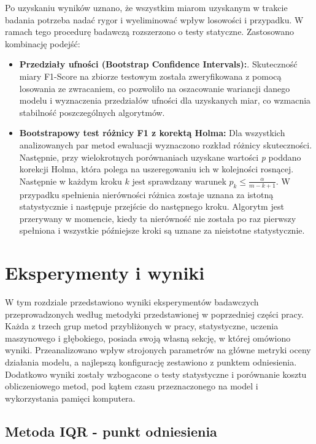 \documentclass[a4paper,twoside,12pt]{book}
\begin{document}
	Po uzyskaniu wyników uznano, że wszystkim miarom uzyskanym w trakcie badania potrzeba nadać rygor i wyeliminować wpływ losowości i przypadku. W ramach tego procedurę badawczą rozszerzono o testy statyczne. Zastosowano kombinację podejść:
	\begin{itemize}
		\item \textbf{Przedziały ufności (Bootstrap Confidence Intervals):}. Skuteczność miary F1-Score na zbiorze testowym została zweryfikowana z pomocą losowania ze zwracaniem, co pozwoliło na oszacowanie wariancji danego modelu i wyznaczenia przedziałów ufności dla uzyskanych miar, co wzmacnia stabilność poszczególnych algorytmów.
		\item \textbf{Bootstrapowy test różnicy F1 z korektą Holma:} Dla wszystkich  analizowanych par metod ewaluacji wyznaczono rozkład różnicy skuteczności. Następnie, przy wielokrotnych porównaniach uzyskane wartości \textit{p} poddano korekcji Holma, która polega na uszeregowaniu ich w kolejności rosnącej. Następnie w każdym kroku $k$ jest sprawdzany warunek $p_k \leq \frac{\alpha}{m - k + 1}$. W przypadku spełnienia nierówności różnica zostaje uznana za istotną statystycznie i następuje przejście do następnego kroku. Algorytm jest przerywany w momencie, kiedy ta nierówność nie została po raz pierwszy spełniona i wszystkie późniejsze kroki są uznane za nieistotne statystycznie.
	\end{itemize}
	
	\chapter{Eksperymenty i wyniki}
	W tym rozdziale przedstawiono wyniki eksperymentów badawczych przeprowadzonych według metodyki przedstawionej w poprzedniej części pracy. Każda z trzech grup metod przybliżonych w pracy, statystyczne, uczenia maszynowego i głębokiego, posiada swoją własną sekcję, w której omówiono wyniki. Przeanalizowano wpływ strojonych parametrów na główne metryki oceny działania modelu, a najlepszą konfigurację zestawiono z punktem odniesienia. Dodatkowo wyniki zostały wzbogacone o testy statystyczne i porównanie kosztu obliczeniowego metod, pod kątem czasu przeznaczonego na model i wykorzystania pamięci komputera. 
	
	\section{Metoda IQR - punkt odniesienia}
	
\end{document}
